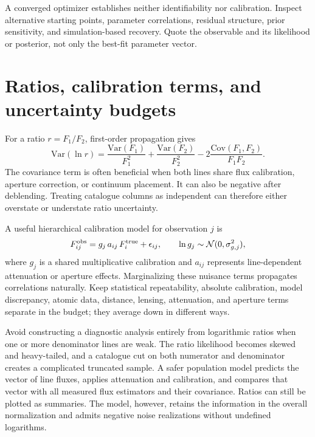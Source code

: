 \begin{tcolorbox}[title={Do not confuse a fit with a measurement},colback=red!3,colframe=red!45!black]
A converged optimizer establishes neither identifiability nor calibration.
Inspect alternative starting points, parameter correlations, residual structure,
prior sensitivity, and simulation-based recovery.  Quote the observable and its
likelihood or posterior, not only the best-fit parameter vector.
\end{tcolorbox}

\section{Ratios, calibration terms, and uncertainty budgets}

For a ratio $r=F_1/F_2$, first-order propagation gives
\begin{equation}
 \mathrm{Var}(\ln r)=
 \frac{\mathrm{Var}(F_1)}{F_1^2}+
 \frac{\mathrm{Var}(F_2)}{F_2^2}-
 2\frac{\mathrm{Cov}(F_1,F_2)}{F_1F_2}.
 \label{eq:ratio-covariance}
\end{equation}
The covariance term is often beneficial when both lines share flux calibration,
aperture correction, or continuum placement.  It can also be negative after
deblending.  Treating catalogue columns as independent can therefore either
overstate or understate ratio uncertainty.

A useful hierarchical calibration model for observation $j$ is
\begin{equation}
 F_{ij}^{\rm obs}=g_j\,a_{ij}\,F_i^{\rm true}+\epsilon_{ij},
 \qquad \ln g_j\sim\mathcal{N}(0,\sigma_{g,j}^2),
 \label{eq:calibration-nuisance}
\end{equation}
where $g_j$ is a shared multiplicative calibration and $a_{ij}$ represents
line-dependent attenuation or aperture effects.  Marginalizing these nuisance
terms propagates correlations naturally.  Keep statistical repeatability,
absolute calibration, model discrepancy, atomic data, distance, lensing,
attenuation, and aperture terms separate in the budget; they average down in
different ways.

Avoid constructing a diagnostic analysis entirely from logarithmic ratios when
one or more denominator lines are weak.  The ratio likelihood becomes skewed
and heavy-tailed, and a catalogue cut on both numerator and denominator creates
a complicated truncated sample.  A safer population model predicts the vector
of line fluxes, applies attenuation and calibration, and compares that vector
with all measured flux estimators and their covariance.  Ratios can still be
plotted as summaries.  The model, however, retains the information in the
overall normalization and admits negative noise realizations without undefined
logarithms.


